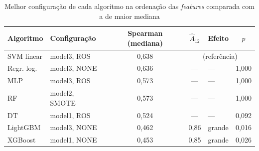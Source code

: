 \begin{table}[htbp]
    
    \centering
    \footnotesize
    \setlength{\tabcolsep}{4pt}%
    \caption{Melhor configuração de cada algoritmo na ordenação das \textit{features} comparada com a de maior mediana}
    \label{tab:res-a12-melhor-feature}
    \begin{tabular}{llcclc}
        \toprule
        Algoritmo & Configuração & Spearman (mediana) & $\hat{A}_{12}$ & Efeito & $p$ \\
        \midrule
        SVM linear & model3, ROS & 0,638 & \multicolumn{3}{c}{(referência)} \\
        Regr. log. & model3, NONE & 0,636 & --- & --- & 1,000 \\
        MLP & model3, ROS & 0,573 & --- & --- & 1,000 \\
        RF & model2, SMOTE & 0,573 & --- & --- & 1,000 \\
        DT & model1, ROS & 0,524 & --- & --- & 0,092 \\
        LightGBM & model3, NONE & 0,462 & 0,86 & grande & 0,016 \\
        XGBoost & model1, NONE & 0,453 & 0,85 & grande & 0,026 \\
        \bottomrule
    \end{tabular}
\end{table}%
